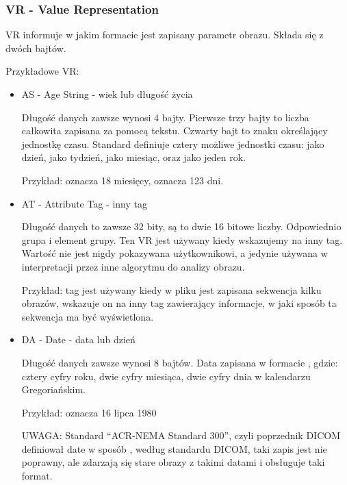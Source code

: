 \subsubsection{VR - Value Representation}
\label{sec:dicom-vr}

VR informuje w jakim formacie jest zapisany parametr obrazu.
Składa się z dwóch bajtów.

Przykładowe VR:
\begin{itemize}
    \item AS - Age String - wiek lub długość życia

    Długość danych zawsze wynosi 4 bajty.
    Pierwsze trzy bajty to liczba całkowita zapisana za pomocą tekstu.
    Czwarty bajt to znaku określający jednostkę czasu.
    Standard definiuje cztery możliwe jednostki czasu:  jako dzień,  jako tydzień,  jako miesiąc, oraz  jako jeden rok.
    
    Przykład:  oznacza 18 miesięcy,  oznacza 123 dni.

    \item AT - Attribute Tag - inny tag

    Długość danych to zawsze 32 bity, są to dwie 16 bitowe liczby.
    Odpowiednio grupa i element grupy.
    Ten VR jest używany kiedy wskazujemy na inny tag.
    Wartość nie jest nigdy pokazywana użytkownikowi, a jedynie używana w interpretacji przez inne algorytmu do analizy obrazu.
    
    Przykład: tag  jest używany kiedy w pliku jest zapisana sekwencja kilku obrazów, wskazuje on na inny tag zawierający informacje, w jaki sposób ta sekwencja ma być wyświetlona.
    
    \item DA - Date - data lub dzień

    Długość danych zawsze wynosi 8 bajtów.
    Data zapisana w formacie , gdzie:  cztery cyfry roku,  dwie cyfry miesiąca,  dwie cyfry dnia w kalendarzu Gregoriańskim.

    Przykład:  oznacza 16 lipca 1980
    
    UWAGA: Standard \enquote{ACR-NEMA Standard 300}, czyli poprzednik DICOM definiował date w sposób , według standardu DICOM, taki zapis jest nie poprawny, ale zdarzają się stare obrazy z takimi datami i  obsługuje taki format.


\end{itemize}
